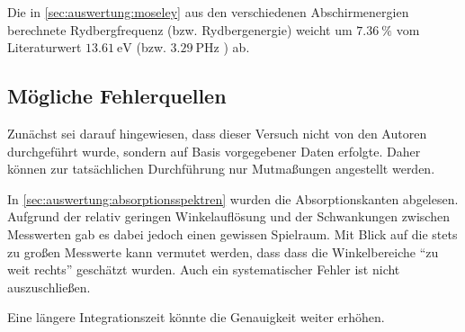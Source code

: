 Die in \autoref{sec:auswertung:moseley} aus den verschiedenen Abschirmenergien berechnete
Rydbergfrequenz (bzw. Rydbergenergie)
weicht um $\SI{7.36}{\percent}$ vom Literaturwert
$\SI{13.61}{\electronvolt}$ \cite{rydhcev} (bzw. $\SI{3.29}{\peta\hertz}$ \cite{rydchz})
ab.


\subsection{Mögliche Fehlerquellen}

Zunächst sei darauf hingewiesen,
dass dieser Versuch nicht von den Autoren durchgeführt wurde,
sondern auf Basis vorgegebener Daten erfolgte.
Daher können zur tatsächlichen Durchführung nur Mutmaßungen angestellt werden.


In \autoref{sec:auswertung:absorptionsspektren} wurden die Absorptionskanten abgelesen.
Aufgrund der relativ geringen Winkelauflösung und der Schwankungen zwischen Messwerten
gab es dabei jedoch einen gewissen Spielraum.
Mit Blick auf die stets zu großen Messwerte kann vermutet werden,
dass dass die Winkelbereiche \enquote{zu weit rechts} geschätzt wurden.
Auch ein systematischer Fehler ist nicht auszuschließen.

Eine längere Integrationszeit könnte die Genauigkeit weiter erhöhen.
